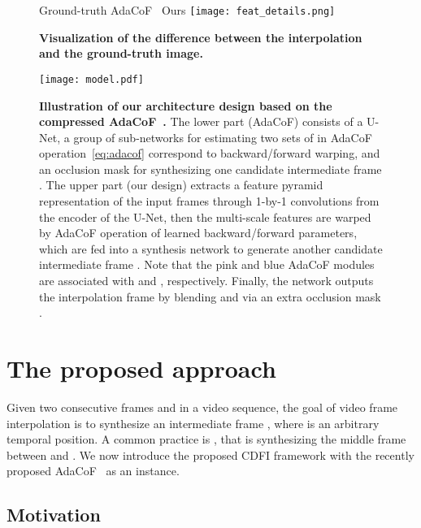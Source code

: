 \documentclass[final]{cvpr}
\begin{document}
\begin{figure}[]
{\small \hspace{-.2in} Ground-truth\hspace{.2in} AdaCoF~\cite{lee2020adacof}\hspace{.3in} Ours}
    \centering
    \texttt{[image: feat\_details.png]}
    \caption{\textbf{Visualization of the difference between the interpolation and the ground-truth image.}}
    \label{fig:feat}
    \vspace{-.15in}
\end{figure}

\begin{figure*}[!ht]
\vspace{-.1in}
    \centering
    \texttt{[image: model.pdf]}
    \caption{\textbf{Illustration of our architecture design based on the compressed AdaCoF~\cite{lee2020adacof}.} The lower part (AdaCoF) consists of a U-Net, a group of sub-networks for estimating two sets of  in AdaCoF operation~\eqref{eq:adacof} correspond to backward/forward warping, and an occlusion mask  for synthesizing one candidate intermediate frame . The upper part (our design) extracts a feature pyramid representation of the input frames through 1-by-1 convolutions from the encoder of the U-Net, then the multi-scale features are warped by AdaCoF operation of learned backward/forward parameters, which are fed into a synthesis network to generate another candidate intermediate frame . Note that the pink and blue AdaCoF modules are associated with  and , respectively. Finally, the network outputs the interpolation frame by blending  and  via an extra occlusion mask .}
    \label{fig:model}
    \vspace{-.15in}
\end{figure*}



\section{The proposed approach}

Given two consecutive frames  and  in a video sequence, the goal of video frame interpolation is to synthesize an intermediate frame , where  is an arbitrary temporal position. 
A common practice is , that is synthesizing the middle frame between  and . We now introduce the proposed CDFI framework with the recently proposed AdaCoF~\cite{lee2020adacof} as an instance.


\subsection{Motivation}
\end{document}
